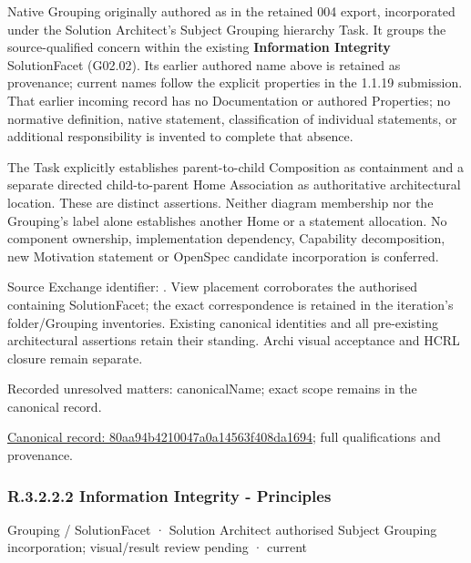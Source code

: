 Native Grouping originally authored as \texttt{} in the retained 004 export,
incorporated under the Solution Architect's Subject Grouping hierarchy Task.
It groups the source-qualified \texttt{} concern within
the existing \textbf{Information Integrity} SolutionFacet (G02.02). Its earlier authored name above is retained as provenance; current names
follow the explicit properties in the 1.1.19 submission.
That earlier incoming record has no Documentation or authored Properties; no normative
definition, native statement, classification of individual statements, or
additional responsibility is invented to complete that absence.



The Task explicitly establishes parent-to-child Composition as containment and
a separate directed child-to-parent Home Association as authoritative architectural
location. These are distinct assertions. Neither diagram membership nor the
Grouping's label alone establishes another Home or a statement allocation.
No component ownership, implementation dependency, Capability decomposition,
new Motivation statement or OpenSpec candidate incorporation is conferred.



Source Exchange identifier: \texttt{}. View placement corroborates
the authorised containing SolutionFacet; the exact correspondence is retained in the
iteration's folder/Grouping inventories. Existing canonical identities and all
pre-existing architectural assertions retain their standing. Archi visual
acceptance and HCRL closure remain separate.


{\small Recorded unresolved matters: canonicalName; exact scope remains in the canonical record.}\par
{\footnotesize \href{../../../../../../../continuum/grouping/80aa94b4210047a0a14563f408da1694.md}{Canonical record: 80aa94b4210047a0a14563f408da1694}; full qualifications and provenance.}\par
\subsubsection*{R.3.2.2.2 Information Integrity - Principles}
\label{navigation:R.3.2.2.2}

\label{element:88d1c3fd640448c2b35933d2b03b8151}
{\small Grouping / SolutionFacet · Solution Architect authorised Subject Grouping incorporation; visual/result review pending · current}\par

